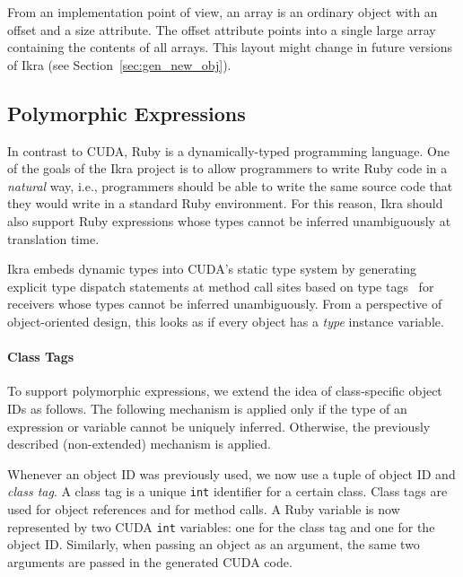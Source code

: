 \documentclass[preprint]{sigplanconf}
\begin{document}
From an implementation point of view, an array is an ordinary object with an offset and a size attribute. The offset attribute points into a single large array containing the contents of all arrays. This layout might change in future versions of Ikra (see Section~\ref{sec:gen_new_obj}).


\subsection{Polymorphic Expressions}
\label{sec:polymorphic}
In contrast to CUDA, Ruby is a dynamically-typed programming language. One of the goals of the Ikra project is to allow programmers to write Ruby code in a \emph{natural} way, i.e., programmers should be able to write the same source code that they would write in a standard Ruby environment. For this reason, Ikra should also support Ruby expressions whose types cannot be inferred unambiguously at translation time.

Ikra embeds dynamic types into CUDA's static type system by generating explicit type dispatch statements at method call sites based on type tags~\cite{Abadi:1989:DTS:75277.75296} for receivers whose types cannot be inferred unambiguously. From a perspective of object-oriented design, this looks as if every object has a \emph{type} instance variable.

\paragraph{Class Tags}
To support polymorphic expressions, we extend the idea of class-specific object IDs as follows. The following mechanism is applied only if the type of an expression or variable cannot be uniquely inferred. Otherwise, the previously described (non-extended) mechanism is applied. 

Whenever an object ID was previously used, we now use a tuple of object ID and \emph{class tag}. A class tag is a unique \texttt{int} identifier for a certain class. Class tags are used for object references and for method calls. A Ruby variable is now represented by two CUDA \texttt{int} variables: one for the class tag and one for the object ID. Similarly, when passing an object as an argument, the same two arguments are passed in the generated CUDA code.
\end{document}
